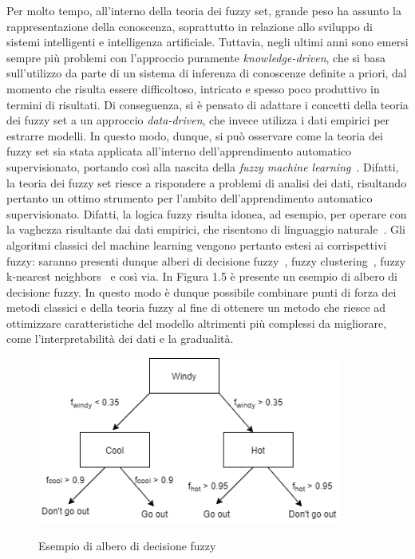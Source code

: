 \documentclass[11pt,  oneside, openany]{book}
\begin{document}
Per molto tempo, all'interno della teoria dei fuzzy set, grande peso ha assunto la rappresentazione della conoscenza, soprattutto in relazione allo sviluppo di sistemi intelligenti e intelligenza artificiale. Tuttavia, negli ultimi anni sono emersi sempre più problemi con l'approccio puramente \textit{knowledge-driven}, che si basa sull'utilizzo da parte di un sistema di inferenza di conoscenze definite a priori, dal momento che risulta essere difficoltoso, intricato e spesso poco produttivo in termini di risultati. Di conseguenza, si è pensato di adattare i concetti della teoria dei fuzzy set a un approccio \textit{data-driven}, che invece utilizza i dati empirici per estrarre modelli. In questo modo, dunque, si può osservare come la teoria dei fuzzy set sia stata applicata all'interno dell'apprendimento automatico supervisionato, portando così alla nascita della \textit{fuzzy machine learning}~\cite{fuzzyml}. Difatti, la teoria dei fuzzy set riesce a rispondere a problemi di analisi dei dati, risultando pertanto un ottimo strumento per l'ambito dell'apprendimento automatico supervisionato. Difatti, la logica fuzzy risulta idonea, ad esempio, per operare con la vaghezza risultante dai dati empirici, che risentono di linguaggio naturale~\cite{fuzzydata}. 
Gli algoritmi classici del machine learning vengono pertanto estesi ai corrispettivi fuzzy: saranno presenti dunque alberi di decisione fuzzy~\cite{fuzzydectree}, fuzzy clustering~\cite{fcm-intro}, fuzzy k-nearest neighbors~\cite{fknn-example1} e così via. In Figura 1.5 è presente un esempio di albero di decisione fuzzy. In questo modo è dunque possibile combinare punti di forza dei metodi classici e della teoria fuzzy al fine di ottenere un metodo che riesce ad ottimizzare caratteristiche del modello altrimenti più complessi da migliorare, come l'interpretabilità dei dati e la gradualità. 

\begin{figure}[h!]
\begin{center}
  \includegraphics[width=10cm]{Immagini/fuzzyTreeDecis.png}\\
  \caption{Esempio di albero di decisione fuzzy}
\end{center}
\end{figure}
\end{document}
